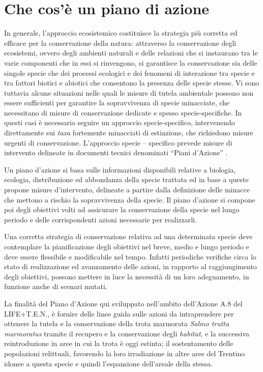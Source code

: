 \documentclass[10pt,twoside,openany,x11names,svgnames,italian,a5paper,dvipsnames,table]{memoir}
\newcommand\chapterillustration{}
\begin{document}
\chapter{Che cos'\`e un piano di azione}
\renewcommand\chapterillustration{}
\footnotesize
\vspace{.5cm}
In generale, l'approccio ecosistemico costituisce la strategia più corretta ed efficace per la conservazione della natura: attraverso la conservazione degli ecosistemi, ovvero degli ambienti naturali e delle relazioni che si instaurano tra le varie componenti che in essi si rinvengono, si garantisce la conservazione sia delle singole specie che dei processi ecologici e dei fenomeni di interazione tra specie e tra fattori biotici e abiotici che consentono la presenza delle specie stesse.
Vi sono tuttavia alcune situazioni nelle quali le misure di tutela ambientale possono non essere sufficienti per garantire la sopravvivenza di specie minacciate, che necessitano di misure di conservazione dedicate e spesso specie-specifiche. In questi casi è necessario seguire un approccio specie-specifico, intervenendo direttamente sui \emph{taxa} fortemente minacciati di estinzione, che richiedono misure urgenti di conservazione. L’approccio specie – specifico prevede misure di intervento delineate in documenti tecnici denominati “Piani d’Azione” \cite{EUCOUNCIL98}.

Un piano d’azione si basa sulle informazioni disponibili relative a biologia, ecologia, distribuzione ed abbondanza della specie trattata ed in base a queste propone misure d’intervento, delineate a partire dalla definizione delle minacce che mettono a rischio la sopravvivenza della specie. Il piano d’azione si compone poi degli obiettivi volti ad assicurare la conservazione della specie nel lungo periodo e delle corrispondenti azioni necessarie per realizzarli.

Una corretta strategia di conservazione relativa ad una determinata specie deve contemplare la pianificazione degli obiettivi nel breve, medio e lungo periodo e deve essere flessibile e modificabile nel tempo. Infatti periodiche verifiche circa lo stato di realizzazione ed avanzamento delle azioni, in rapporto al raggiungimento degli obiettivi, possono mettere in luce la necessità di un loro adeguamento, in funzione anche di scenari mutati.

La finalità del Piano d'Azione qui sviluppato nell’ambito dell'Azione A.8 del LIFE+T.E.N., è fornire delle linee guida sulle azioni da intraprendere per ottenere la tutela e la conservazione della trota marmorata \emph{Salmo trutta marmoratus} tramite il recupero e la conservazione degli \emph{habitat}, e la successiva reintroduzione in aree in cui la trota è oggi estinta; il sostentamento delle popolazioni relittuali, favorendo la loro irradiazione in altre aree del Trentino idonee a questa specie e quindi l’espansione dell’areale della stessa. \\
\end{document}
